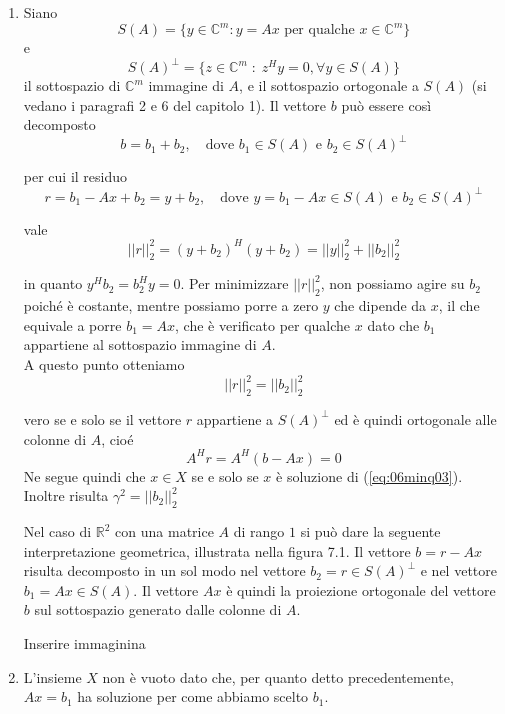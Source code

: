 \begin{thproof}
  \begin{enumerate}
  \item Siano
$$ S(A) = \{ y \in \mathbb{C}^{m}: y = Ax 
\text{ per qualche } x \in \mathbb{C}^{m} \}$$ e
$$
S(A)^{\bot} = \{ z \in \mathbb{C}^{m} \; : \; z^{H}y = 0, \forall y
\in S(A) \}
$$
il sottospazio di $\mathbb{C}^m$ immagine di $A$, e il sottospazio
ortogonale a $S(A)$ (si vedano i paragrafi 2 e 6 del capitolo 1).  Il
vettore $b$ pu\`o essere cos\`i decomposto
 $$ b = b_1 + b_2, \quad \text{dove } 
 b_1 \in S(A) \text{ e } b_2 \in S(A)^{\bot} $$

per cui il residuo
$$ r=b_1 - Ax + b_2 = y + b_2, \quad
\text{dove } y=b_1 - Ax \in S(A) \text{ e } b_2 \in S(A)^{\bot}$$

vale
$$ ||r||_{2}^{2} = (y + b_2)^{H} (y + b_2) = 
||y||_{2}^{2} + ||b_2||_{2}^{2}$$ 

in quanto $y^{H}b_2 = b_2^{H}y=0$. Per minimizzare $||r||_{2}^{2}$,
non possiamo agire su $b_2$ poich\'e \`e costante, mentre possiamo
porre a zero $y$ che dipende da $x$, il che equivale a porre $b_1 = Ax$, 
che \`e verificato per qualche $x$ dato che $b_1$ appartiene al
sottospazio immagine di $A$. \\
A questo punto otteniamo 
$$ ||r||_{2}^{2} = ||b_2||_{2}^{2}$$

vero se e solo se il vettore $r$ appartiene a $S(A)^{\bot}$ ed \`e quindi ortogonale
alle colonne di $A$, cio\'e
$$A^{H}r = A^{H} (b − Ax) = 0$$
Ne segue quindi che $x \in X$ se e solo se $x$ \`e soluzione di
(\ref{eq:06minq03}).  Inoltre risulta $\gamma^{2} = ||b_2||_{2}^{2}$

Nel caso di $\mathbb{R}^2$ con una matrice $A$ di rango $1$ si pu\`o
dare la seguente interpretazione geometrica, illustrata nella figura
7.1. Il vettore $b = r − Ax$ risulta decomposto in un sol modo nel
vettore $b_2 = r \in S(A)^{\bot}$ e nel vettore $b_1 = Ax \in S(A)$.
Il vettore $Ax$ \`e quindi la proiezione ortogonale del vettore $b$
sul sottospazio generato dalle colonne di $A$.
\begin{todo} Inserire immaginina
\end{todo}

\item L'insieme $X$ non \`e vuoto dato che, per quanto detto
precedentemente, $Ax=b_1$ ha soluzione per come abbiamo scelto $b_1$.\\


\end{enumerate}
\end{thproof}
